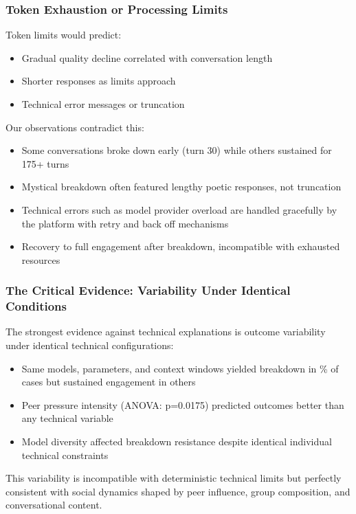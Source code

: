 \documentclass[11pt,letterpaper]{article}
\newcommand{\exponedataTotalSessionsRaw}{26}
\newcommand{\exponedataBreakdownSessionsRaw}{10}
\newcommand{\exponedataBreakdownPercentage}{%
  \fpeval{round(\exponedataBreakdownSessionsRaw / \exponedataTotalSessionsRaw * 100, 1)}\%
}
\newcommand{\exponedataPeerPressureANOVAPValue}{p=0.0175}
\begin{document}
\subsubsection{Token Exhaustion or Processing Limits}

Token limits would predict:
\begin{itemize}
    \item Gradual quality decline correlated with conversation length
    \item Shorter responses as limits approach
    \item Technical error messages or truncation
\end{itemize}

Our observations contradict this:
\begin{itemize}
    \item Some conversations broke down early (turn 30) while others sustained for 175+ turns
    \item Mystical breakdown often featured lengthy poetic responses, not truncation
    \item Technical errors such as model provider overload are handled gracefully by the platform with retry and back off mechanisms
    \item Recovery to full engagement after breakdown, incompatible with exhausted resources
\end{itemize}

\subsubsection{The Critical Evidence: Variability Under Identical Conditions}

The strongest evidence against technical explanations is outcome variability under identical technical configurations:
\begin{itemize}
    \item Same models, parameters, and context windows yielded breakdown in \exponedataBreakdownPercentage{} of cases but sustained engagement in others
    \item Peer pressure intensity (ANOVA: \exponedataPeerPressureANOVAPValue{}) predicted outcomes better than any technical variable
    \item Model diversity affected breakdown resistance despite identical individual technical constraints
\end{itemize}

This variability is incompatible with deterministic technical limits but perfectly consistent with social dynamics shaped by peer influence, group composition, and conversational content.
\end{document}
